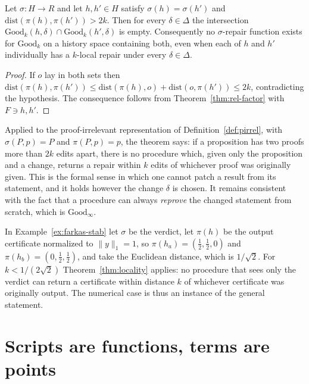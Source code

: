 \begin{theorem}
\label{thm:locality}
Let $\sigma:H\to R$ and let $h,h'\in H$ satisfy $\sigma(h)=\sigma(h')$ and $\mathrm{dist}(\pi(h),\pi(h'))>2k$. Then for every $\delta\in\Delta$ the intersection $\mathrm{Good}_k(h,\delta)\cap\mathrm{Good}_k(h',\delta)$ is empty. Consequently no $\sigma$-repair function exists for $\mathrm{Good}_k$ on a history space containing both, even when each of $h$ and $h'$ individually has a $k$-local repair under every $\delta\in\Delta$.
\end{theorem}

\begin{proof}
If $o$ lay in both sets then $\mathrm{dist}(\pi(h),\pi(h'))\le\mathrm{dist}(\pi(h),o)+\mathrm{dist}(o,\pi(h'))\le2k$, contradicting the hypothesis. The consequence follows from Theorem~\ref{thm:rel-factor} with $F\ni h,h'$.
\end{proof}

Applied to the proof-irrelevant representation of Definition~\ref{def:pirrel}, with $\sigma(P,p)=P$ and $\pi(P,p)=p$, the theorem says: if a proposition has two proofs more than $2k$ edits apart, there is no procedure which, given only the proposition and a change, returns a repair within $k$ edits of whichever proof was originally given. This is the formal sense in which one cannot patch a result from its statement, and it holds however the change $\delta$ is chosen. It remains consistent with the fact that a procedure can always \emph{reprove} the changed statement from scratch, which is $\mathrm{Good}_\infty$.

\begin{remark}
\label{rem:cert-locality}
In Example~\ref{ex:farkas-stab} let $\sigma$ be the verdict, let $\pi(h)$ be the output certificate normalized to $\|y\|_1=1$, so $\pi(h_a)=(\tfrac12,\tfrac12,0)$ and $\pi(h_b)=(0,\tfrac12,\tfrac12)$, and take the Euclidean distance, which is $1/\sqrt2$. For $k<1/(2\sqrt2)$ Theorem~\ref{thm:locality} applies: no procedure that sees only the verdict can return a certificate within distance $k$ of whichever certificate was originally output. The numerical case is thus an instance of the general statement.
\end{remark}

\section{Scripts are functions, terms are points}

